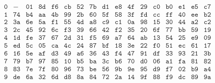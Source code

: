 \begin{Revision}
\begin{ejs}
\begin{table}[H]
\[\begin{array}{c|*{16}{c}}
\texttt{0} & - & \texttt{01} & \texttt{8d} & \texttt{f6} & \texttt{cb} & \texttt{52} & \texttt{7b} & \texttt{d1} & \texttt{e8} & \texttt{4f} & \texttt{29} & \texttt{c0} & \texttt{b0} & \texttt{e1} & \texttt{e5} & \texttt{c7} \\
\texttt{1} & \texttt{74} & \texttt{b4} & \texttt{aa} & \texttt{4b} & \texttt{99} & \texttt{2b} & \texttt{60} & \texttt{5f} & \texttt{58} & \texttt{3f} & \texttt{fd} & \texttt{cc} & \texttt{ff} & \texttt{40} & \texttt{ee} & \texttt{b2} \\
\texttt{2} & \texttt{3a} & \texttt{6e} & \texttt{5a} & \texttt{f1} & \texttt{55} & \texttt{4d} & \texttt{a8} & \texttt{c9} & \texttt{c1} & \texttt{0a} & \texttt{98} & \texttt{15} & \texttt{30} & \texttt{44} & \texttt{a2} & \texttt{c2} \\
\texttt{3} & \texttt{2c} & \texttt{45} & \texttt{92} & \texttt{6c} & \texttt{f3} & \texttt{39} & \texttt{66} & \texttt{42} & \texttt{f2} & \texttt{35} & \texttt{20} & \texttt{6f} & \texttt{77} & \texttt{bb} & \texttt{59} & \texttt{19} \\
\texttt{4} & \texttt{1d} & \texttt{fe} & \texttt{37} & \texttt{67} & \texttt{2d} & \texttt{31} & \texttt{f5} & \texttt{69} & \texttt{a7} & \texttt{64} & \texttt{ab} & \texttt{13} & \texttt{54} & \texttt{25} & \texttt{e9} & \texttt{09} \\
\texttt{5} & \texttt{ed} & \texttt{5c} & \texttt{05} & \texttt{ca} & \texttt{4c} & \texttt{24} & \texttt{87} & \texttt{bf} & \texttt{18} & \texttt{3e} & \texttt{22} & \texttt{f0} & \texttt{51} & \texttt{ec} & \texttt{61} & \texttt{17} \\
\texttt{6} & \texttt{16} & \texttt{5e} & \texttt{af} & \texttt{d3} & \texttt{49} & \texttt{a6} & \texttt{36} & \texttt{43} & \texttt{f4} & \texttt{47} & \texttt{91} & \texttt{df} & \texttt{33} & \texttt{93} & \texttt{21} & \texttt{3b} \\
\texttt{7} & \texttt{79} & \texttt{b7} & \texttt{97} & \texttt{85} & \texttt{10} & \texttt{b5} & \texttt{ba} & \texttt{3c} & \texttt{b6} & \texttt{70} & \texttt{d0} & \texttt{06} & \texttt{a1} & \texttt{fa} & \texttt{81} & \texttt{82} \\
\texttt{8} & \texttt{83} & \texttt{7e} & \texttt{7f} & \texttt{80} & \texttt{96} & \texttt{73} & \texttt{be} & \texttt{56} & \texttt{9b} & \texttt{9e} & \texttt{95} & \texttt{d9} & \texttt{f7} & \texttt{02} & \texttt{b9} & \texttt{a4} \\
\texttt{9} & \texttt{de} & \texttt{6a} & \texttt{32} & \texttt{6d} & \texttt{d8} & \texttt{8a} & \texttt{84} & \texttt{72} & \texttt{2a} & \texttt{14} & \texttt{9f} & \texttt{88} & \texttt{f9} & \texttt{dc} & \texttt{89} & \texttt{9a} \\

\end{array}\]
\end{table}
\end{ejs}
\end{Revision}

